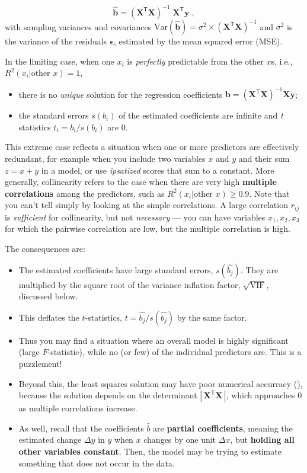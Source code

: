 \documentclass[
  letterpaper,
  10pt,
  krantz2]{krantz}
\providecommand{\tightlist}{%
  \setlength{\itemsep}{0pt}\setlength{\parskip}{0pt}}\usepackage{longtable,booktabs,array}
\begin{document}
\[
\widehat{\mathbf{b}} = (\mathbf{X}^\mathsf{T} \mathbf{X})^{-1} \; \mathbf{X}^\mathsf{T} \mathbf{y} \; ,
\] with sampling variances and covariances
\(\text{Var} (\widehat{\mathbf{b}}) = \sigma^2 \times (\mathbf{X}^\mathsf{T} \mathbf{X})^{-1}\)
and \(\sigma^2\) is the variance of the residuals \(\mathbf{\epsilon}\),
estimated by the mean squared error (MSE).

In the limiting case, when one \(x_i\) is \emph{perfectly} predictable
from the other \(x\)s, i.e., \(R^2 (x_i | \text{other }x) = 1\),

\begin{itemize}
\tightlist
\item
  there is no \emph{unique} solution for the regression coefficients
  \(\mathbf{b} = (\mathbf{X}^\mathsf{T} \mathbf{X})^{-1} \mathbf{X} \mathbf{y}\);
\item
  the standard errors \(s (b_i)\) of the estimated coefficients are
  infinite and \emph{t} statistics \(t_i = b_i / s (b_i)\) are 0.
\end{itemize}

This extreme case reflects a situation when one or more predictors are
effectively redundant, for example when you include two variables \(x\)
and \(y\) and their sum \(z = x + y\) in a model, or use
\emph{ipsatized} scores that sum to a constant. More generally,
collinearity refers to the case when there are very high
\textbf{multiple correlations} among the predictors, such as
\(R^2 (x_i | \text{other }x) \ge 0.9\). Note that you can't tell simply
by looking at the simple correlations. A large correlation \(r_{ij}\) is
\emph{sufficient} for collinearity, but not \emph{necessary} --- you can
have variables \(x_1, x_2, x_3\) for which the pairwise correlation are
low, but the multiple correlation is high.

The consequences are:

\begin{itemize}
\tightlist
\item
  The estimated coefficients have large standard errors,
  \(s(\hat{b_j})\). They are multiplied by the square root of the
  variance inflation factor, \(\sqrt{\text{VIF}}\), discussed below.
\item
  This deflates the \(t\)-statistics, \(t = \hat{b_j} / s(\hat{b_j})\)
  by the same factor.
\item
  Thus you may find a situation where an overall model is highly
  significant (large \(F\)-statistic), while no (or few) of the
  individual predictors are. This is a puzzlement!
\item
  Beyond this, the least squares solution may have poor numerical
  accurracy (), because the
  solution depends on the determinant
  \(|\,\mathbf{X}^\mathsf{T} \mathbf{X}\,|\), which approaches 0 as
  multiple correlations increase.
\item
  As well, recall that the coefficients \(\hat{b}\) are \textbf{partial
  coefficients}, meaning the estimated change \(\Delta y\) in \(y\) when
  \(x\) changes by one unit \(\Delta x\), but \textbf{holding all other
  variables constant}. Then, the model may be trying to estimate
  something that does not occur in the data.
\end{itemize}
\end{document}
